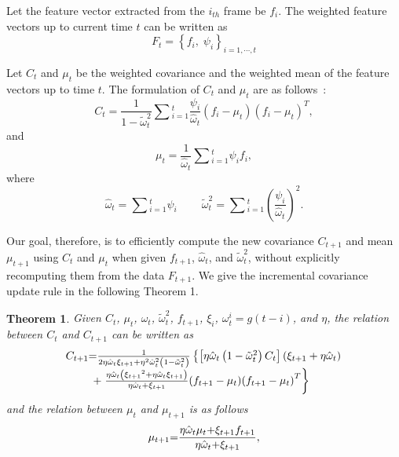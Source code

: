 \documentclass[sigconf]{acmart}
\begin{document}
Let the feature vector extracted from the $i_{th}$ frame be ${f_i}$. The weighted feature vectors up to current time $t$ can be written as
\begin{equation}\label{FVectorSetTimeT}
{F_t} = {\left\{ {{f_i},\;{\psi _i}} \right\}_{i = 1, \cdots ,t}}
\end{equation}

Let $C_t$ and $\mu_t$ be the weighted covariance and the weighted mean of the feature vectors up to time $t$. The
formulation of $C_t$ and $\mu_t$ are as follows~\cite{price1972extension}:
\begin{equation}\label{CovT}
{C_t} = \frac{1}{{1 - \tilde \omega _t^2}}\sum {_{i= 1}^t\frac{\psi_i}{{{{\hat \omega }_t}}}({f_i} - {\mu _t}){{({f_i} - {\mu _t})}^T}},
\end{equation}
and
\begin{equation}\label{MeanT}
{\mu _t} = \frac{1}{{{{\hat \omega }_t}}}\sum {_{i = 1}^t} \psi_i{f_i},
\end{equation}
where
\begin{equation*}{{\hat \omega }_t} = \sum {_{i = 1}^t} \psi_i \;\;\;\;\;\;\;\; \tilde \omega _t^2 = \sum {_{i = 1}^t} {\left( {\frac{{\psi_i}}{{{{\hat \omega }_t}}}} \right)^2}.
\end{equation*}

Our goal, therefore, is to efficiently compute the new covariance $C_{t+1}$ and mean $\mu_{t+1}$ using $C_t$ and $\mu_t$ when given $f_{t+1}$, ${\hat \omega }_{t}$, and $\tilde \omega _{t}^2$, without explicitly recomputing them from the data ${F_{t+1}}$. We give the incremental
covariance update rule in the following Theorem 1.
\newtheorem{CovUpdateRule}{Theorem}\label{CovUpdateRule}
\begin{CovUpdateRule}
Given $C_t$, $\mu_t$, ${\hat \omega }_{t}$, $\tilde \omega _{t}^2$, $f_{t+1}$,
$\xi_i$, $\omega _t^i = {g(t-i)}$, and $\eta$, the relation between
$C_t$ and $C_{t+1}$ can be written as
\begin{equation}\label{IncrementalCovRule}
\begin{array}{l}
{C_{t + 1}}{\rm{ = }}\frac{1}{{2\eta {{\hat \omega }_t}{\xi _{t + 1}} + {\eta ^2}{{\hat \omega }_t}^2\left( {1 - \tilde \omega _t^2} \right)}}\left\{ {\left[ {\eta {{\hat \omega }_t}\left( {1 - \tilde \omega _t^2} \right){C_t}} \right]\left( {{\xi _{t + 1}} + \eta {{\hat \omega }_t}} \right)} \right.\\
\;\;\;\;\;\;\;\;\; + \left. {\frac{{\eta {{\hat \omega }_t}\left( {{\xi _{t + 1}}^2 + \eta {{\hat \omega }_t}{\xi _{t + 1}}} \right)}}{{\eta {{\hat \omega }_t} + {\xi _{t + 1}}}}({f_{t + 1}} - {\mu _t}){{({f_{t + 1}} - {\mu _t})}^T}} \right\}
\end{array}
\end{equation}
and the relation between $\mu_t$ and $\mu_{t+1}$ is as follows
\begin{equation}\label{IncrementalMeanRule}
{\mu _{t{\rm{ + }}1}}{\rm{ = }}\frac{{\eta {{\hat \omega }_t}{\mu _t}{\rm{ + }}{\xi _{t + 1}}{f_{t + 1}}}}{{\eta {{\hat \omega }_t}{\rm{ + }}{\xi _{t + 1}}}},
\end{equation}
\end{CovUpdateRule}
\end{document}
